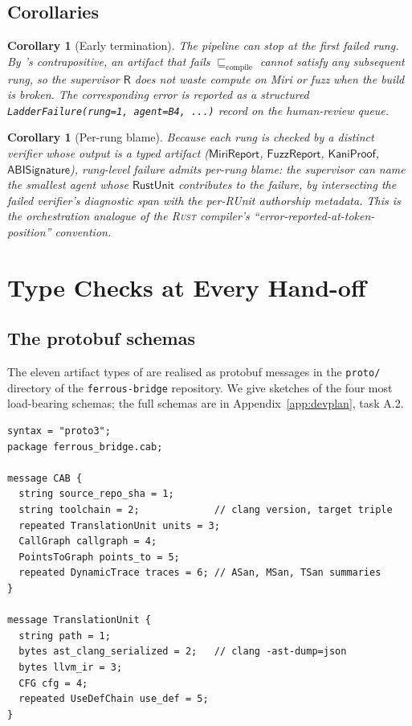 \documentclass[12pt]{article}
\newtheorem{corollary}[theorem]{Corollary}
\theoremstyle{definition}
\theoremstyle{remark}
\newcommand{\rust}{\textnormal{\textsc{Rust}}}
\newcommand{\Agent}[1]{\ensuremath{\mathsf{#1}}}
\newcommand{\Artifact}[1]{\ensuremath{\mathsf{#1}}}
\newcommand{\Compile}{\ensuremath{\sqsubseteq_{\!\mathrm{compile}}}}
\newcommand{\RUnit}{\Artifact{RustUnit}}
\newcommand{\MiriR}{\Artifact{MiriReport}}
\newcommand{\FuzzR}{\Artifact{FuzzReport}}
\newcommand{\KaniP}{\Artifact{KaniProof}}
\newcommand{\ABISig}{\Artifact{ABISignature}}
\begin{document}
\subsection{Corollaries}

\begin{corollary}[Early termination]
\label{cor:early}
The pipeline can stop at the first failed rung. By
's contrapositive, an artifact that fails
\(\Compile\) cannot satisfy any subsequent rung, so the supervisor
\(\Agent{R}\) does not waste compute on Miri or fuzz when the build is
broken. The corresponding error is reported as a structured
\texttt{LadderFailure(rung=1, agent=B4, ...)} record on the
human-review queue.
\end{corollary}

\begin{corollary}[Per-rung blame]
\label{cor:blame}
Because each rung is checked by a distinct verifier whose output is a
typed artifact (\MiriR, \FuzzR, \KaniP, \ABISig), rung-level failure
admits per-rung blame: the supervisor can name the smallest agent whose
\RUnit{} contributes to the failure, by intersecting the failed
verifier's diagnostic span with the per-RUnit{} authorship metadata.
This is the orchestration analogue of the \rust{} compiler's
``error-reported-at-token-position'' convention.
\end{corollary}

\section{Type Checks at Every Hand-off}
\label{sec:typecheck}

\subsection{The protobuf schemas}

The eleven artifact types of  are realised
as protobuf messages in the \texttt{proto/} directory of the
\texttt{ferrous-bridge} repository. We give sketches of the four most
load-bearing schemas; the full schemas are in
Appendix~\ref{app:devplan}, task A.2.

\begin{lstlisting}[style=protostyle, caption={\texttt{cab.proto} sketch}]
syntax = "proto3";
package ferrous_bridge.cab;

message CAB {
  string source_repo_sha = 1;
  string toolchain = 2;             // clang version, target triple
  repeated TranslationUnit units = 3;
  CallGraph callgraph = 4;
  PointsToGraph points_to = 5;
  repeated DynamicTrace traces = 6; // ASan, MSan, TSan summaries
}

message TranslationUnit {
  string path = 1;
  bytes ast_clang_serialized = 2;   // clang -ast-dump=json
  bytes llvm_ir = 3;
  CFG cfg = 4;
  repeated UseDefChain use_def = 5;
}
\end{lstlisting}
\end{document}

